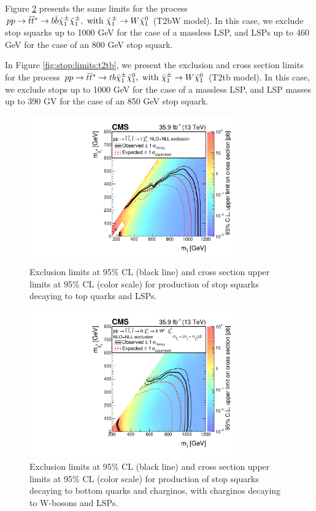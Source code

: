 Figure \ref{fig:stop:limits:t2bw} presents the same limits for the
process $pp \rightarrow \tilde{t}\tilde{t}^* \rightarrow b\bar{b}
\tilde{\chi}^\pm_1 \tilde{\chi}^\pm_1,\text{ with } \tilde{\chi}^\pm_1 \rightarrow W
\tilde{\chi}^0_1$ (T2bW model). In this case, we exclude stop squarks up to 1000
GeV for the case of a massless LSP, and LSPs up to 460 GeV for the
case of an 800 GeV stop squark.

In Figure \ref{fig:stop:limits:t2tb}, we present the exclusion and cross
section limits for the process $pp \rightarrow \tilde{t}\tilde{t}^*
\rightarrow tb \tilde{\chi}^\pm_1 \tilde{\chi}^0_1,\text{ with } \tilde{\chi}^\pm_1 \rightarrow
W \tilde{\chi}^0_1$ (T2tb model). In this case, we exclude stops up to 1000 GeV
for the case of a massless LSP, and LSP masses up to 390 GV for the
case of an 850 GeV stop squark.

\begin{figure}[htbp]
\centering
\includegraphics[width=0.8\textwidth]{figures/limits_T2tt.pdf}
\caption{Exclusion limits at 95\% CL (black line) and cross section
  upper limits at 95\% CL (color scale) for production of stop squarks
  decaying to top quarks and LSPs.}
\label{fig:stop:limits:t2tt}
\end{figure}

\begin{figure}[htbp]
\centering
\includegraphics[width=0.8\textwidth]{figures/limits_T2bW.pdf}
\caption{Exclusion limits at 95\% CL (black line) and cross section
  upper limits at 95\% CL (color scale) for production of stop squarks
  decaying to bottom quarks and charginos, with charginos decaying to
  W-bosons and LSPs.}
\label{fig:stop:limits:t2bw}
\end{figure}

